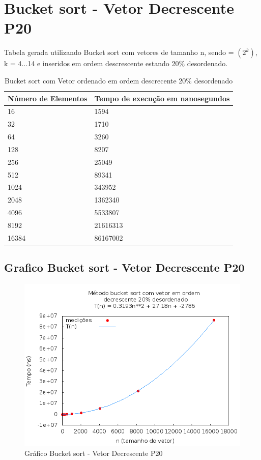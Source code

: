 \documentclass[12pt,a4paper,twoside]{report}
\begin{document}
\section{Bucket sort - Vetor Decrescente P20}
Tabela gerada utilizando Bucket sort com vetores de tamanho n, sendo = $(2^k)$, k = 4...14 e inseridos em ordem descrescente estando 20\% desordenado.

\begin{table}[H]
\centering
\caption{Bucket sort com Vetor ordenado em ordem descrecente 20\% desordenado}
\label{my-label}
\begin{tabular}{|l|l|}
\hline
\multicolumn{1}{|c|}{\textbf{Número de Elementos}} & \multicolumn{1}{c|}{\textbf{Tempo de execução em nanosegundos}} \\ \hline
16 & 1594 \\ \hline
32 & 1710 \\ \hline
64 & 3260 \\ \hline
128 & 8207 \\ \hline
256 & 25049 \\ \hline
512 & 89341 \\ \hline
1024 & 343952 \\ \hline
2048 & 1362340 \\ \hline
4096 & 5533807 \\ \hline
8192 & 21616313 \\ \hline
16384 & 86167002 \\ \hline
\end{tabular}
\end{table}

\subsection{Grafico Bucket sort - Vetor Decrescente P20}
\begin{figure}[H]
    \centering
    \includegraphics[width=0.7\linewidth]{graficos/Bucket/vIntDecrescenteP20/vIntDecrescenteP20.png}
  \caption{Gráfico Bucket sort - Vetor Decrescente P20}
\end{figure}
\end{document}

